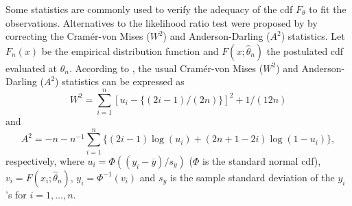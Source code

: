 \documentclass[10pt,letterpaper]{article}
\begin{document}
Some statistics are commonly used to verify the adequacy of the cdf $F_\theta$ to fit the observations.
Alternatives to the likelihood ratio test were proposed by \cite{chen1995general} by correcting the Cram\'er-von Mises ($W^2$) and Anderson-Darling ($A^2$) statistics.
Let $F_n(x)$ be the empirical distribution function and $F(x;\widehat \theta_n)$ the postulated cdf evaluated at $\widehat \theta_n$.
According to \cite{chen1995general}, the usual Cram\'er-von Mises ($W^2$) and Anderson-Darling ($A^2$) statistics can be expressed as
\begin{equation}
\label{eq:w2}
W^2 = \sum_{i=1}^{n}[u_i - \{(2i-1)/(2n) \}]^2 + 1/(12n)
\end{equation}
and
\begin{equation}
\label{eq:a2}
A^2 = -n - n^{-1}\sum_{i=1}^{n}\{(2i-1)\log(u_i) + (2n+1-2i)\log(1-u_i)\},
\end{equation}
respectively, where $u_i = \Phi((y_i-\overline{y})/s_y)$ ($\Phi$ is the standard normal cdf),
$v_i = F(x_i; \widehat \theta_n)$, $y_i = \Phi^{-1}(v_i)$ and $s_y$ is the sample standard deviation of the $y_i$'s for $i=1,\ldots, n$.
\end{document}
